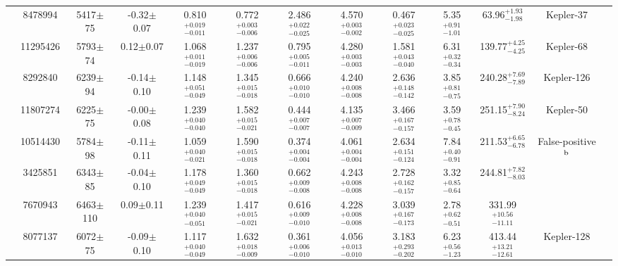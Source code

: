 \begin{table}
\begin{tabular}{ccccccccccccc}
\smallskip
 245 &         8478994 & 5417$\pm$ 75 & -0.32$\pm$0.07 & 0.810$^{+ 0.019}_{-0.011}$& 0.772$^{+ 0.003}_{-0.006}$& 2.486$^{+ 0.022}_{-0.025}$& 4.570$^{+ 0.003}_{-0.002}$&  0.467$^{+ 0.023}_{-0.025}$&  5.35$^{+ 0.91}_{-1.01}$& 63.96$^{+  1.93}_{-  1.98}$ &           Kepler-37 & \citet{Barclay:2013fk}  \\
\smallskip
 246 &        11295426 & 5793$\pm$ 74 &  0.12$\pm$0.07 & 1.068$^{+ 0.011}_{-0.019}$& 1.237$^{+ 0.006}_{-0.006}$& 0.795$^{+ 0.005}_{-0.011}$& 4.280$^{+ 0.003}_{-0.003}$&  1.581$^{+ 0.043}_{-0.040}$&  6.31$^{+ 0.32}_{-0.34}$&139.77$^{+  4.25}_{-  4.25}$ &          Kepler-68 &\citet{Gilliland:2013ep}  \\
\smallskip
 260 &         8292840 & 6239$\pm$ 94 & -0.14$\pm$0.10 & 1.148$^{+ 0.051}_{-0.049}$& 1.345$^{+ 0.015}_{-0.018}$& 0.666$^{+ 0.010}_{-0.010}$& 4.240$^{+ 0.008}_{-0.008}$&  2.636$^{+ 0.148}_{-0.142}$&  3.85$^{+ 0.81}_{-0.75}$&240.28$^{+  7.69}_{-  7.89}$ &             Kepler-126  &\citet{Rowe:2014jq}  \\
\smallskip
 262 &        11807274 & 6225$\pm$ 75 & -0.00$\pm$0.08 & 1.239$^{+ 0.040}_{-0.040}$& 1.582$^{+ 0.015}_{-0.021}$& 0.444$^{+ 0.007}_{-0.007}$& 4.135$^{+ 0.007}_{-0.009}$&  3.466$^{+ 0.167}_{-0.157}$&  3.59$^{+ 0.78}_{-0.45}$&251.15$^{+  7.90}_{-  8.24}$ &           Kepler-50 & \citet{Steffen:2013ja}  \\
\smallskip
 263 &        10514430 & 5784$\pm$ 98 & -0.11$\pm$0.11 & 1.059$^{+ 0.040}_{-0.021}$& 1.590$^{+ 0.015}_{-0.018}$& 0.374$^{+ 0.004}_{-0.004}$& 4.061$^{+ 0.004}_{-0.004}$&  2.634$^{+ 0.151}_{-0.124}$&  7.84$^{+ 0.40}_{-0.91}$&211.53$^{+  6.65}_{-  6.78}$ &                   False-positive$^{\rm b}$ &  \\
\smallskip
 268 &         3425851 & 6343$\pm$ 85 & -0.04$\pm$0.10 & 1.178$^{+ 0.049}_{-0.049}$& 1.360$^{+ 0.015}_{-0.018}$& 0.662$^{+ 0.009}_{-0.008}$& 4.243$^{+ 0.008}_{-0.008}$&  2.728$^{+ 0.162}_{-0.157}$&  3.32$^{+ 0.85}_{-0.64}$&244.81$^{+  7.82}_{-  8.03}$ &                                           &   \\
\smallskip
 269 &         7670943 & 6463$\pm$110 &  0.09$\pm$0.11 & 1.239$^{+ 0.040}_{-0.051}$& 1.417$^{+ 0.015}_{-0.021}$& 0.616$^{+ 0.009}_{-0.010}$& 4.228$^{+ 0.008}_{-0.008}$&  3.039$^{+ 0.167}_{-0.173}$&  2.78$^{+ 0.62}_{-0.51}$&331.99$^{+ 10.56}_{- 11.11}$ &                                           &   \\
\smallskip
 274 &         8077137 & 6072$\pm$ 75 & -0.09$\pm$0.10 & 1.117$^{+ 0.040}_{-0.049}$& 1.632$^{+ 0.018}_{-0.009}$& 0.361$^{+ 0.006}_{-0.010}$& 4.056$^{+ 0.013}_{-0.010}$&  3.183$^{+ 0.293}_{-0.202}$&  6.23$^{+ 0.56}_{-1.23}$&413.44$^{+ 13.21}_{- 12.61}$ &              Kepler-128  &\citet{Xie:2014jk}  \\

\end{tabular}
\end{table}
